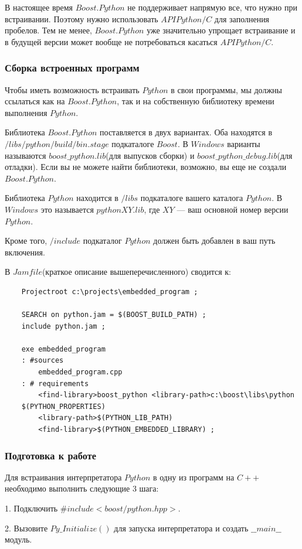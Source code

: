 \documentclass[a4paper, 14pt]{extarticle}
\begin{document}
В настоящее время $Boost.Python$ не поддерживает напрямую все, что нужно при встраивании. Поэтому нужно использовать $API Python / C$ для заполнения пробелов. Тем не менее, $Boost.Python$ уже значительно упрощает встраивание и в будущей версии может вообще не потребоваться касаться $API Python / C$.

\subsubsection{Сборка встроенных программ}
Чтобы иметь возможность встраивать $Python$ в свои программы, мы должны ссылаться как на $Boost.Python$, так и на собственную библиотеку времени выполнения $Python$.

Библиотека $Boost.Python$ поставляется в двух вариантах. Оба находятся в $/libs/python/build/bin.stage$ подкаталоге $Boost$. В $Windows$ варианты называются $boost\_python.lib$(для выпусков сборки) и $boost\_python\_debug.lib$(для отладки). Если вы не можете найти библиотеки, возможно, вы еще не создали $Boost.Python$.

Библиотека $Python$ находится в $/libs$ подкаталоге вашего каталога $Python$. В $Windows$ это называется $pythonXY.lib$, где $XY$ --- ваш основной номер версии $Python$.

Кроме того, $/include$ подкаталог $Python$ должен быть добавлен в ваш путь включения.

В $Jamfile$(краткое описание вышеперечисленного) сводится к:
\begin{verbatim}
    Projectroot c:\projects\embedded_program ;

    SEARCH on python.jam = $(BOOST_BUILD_PATH) ;
    include python.jam ;

    exe embedded_program
    : #sources
        embedded_program.cpp
    : # requirements
        <find-library>boost_python <library-path>c:\boost\libs\python
    $(PYTHON_PROPERTIES)
        <library-path>$(PYTHON_LIB_PATH)
        <find-library>$(PYTHON_EMBEDDED_LIBRARY) ;
\end{verbatim}

\subsubsection{Подготовка к работе}
Для встраивания интерпретатора $Python$ в одну из программ на $C++$ необходимо выполнить следующие 3 шага:

1. Подключить $\#include <boost/python.hpp>$.

2. Вызовите $Py\_Initialize()$ для запуска интерпретатора и создать $\_\_main\_\_$  модуль.
\end{document}
